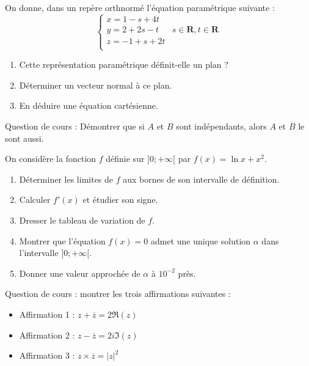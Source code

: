 \begin{question}[topic=géométrie]
On donne, dans un repère orthnormé l'équation paramétrique suivante :
\[ \left\lbrace \begin{array}{lc}
    x = 1 - s + 4t &                                 \\
    y = 2 + 2s -t  & s\in\mathbf{R}, t\in \mathbf{R} \\
    z = -1 +s + 2t &                                 \\
\end{array}\right.\]

\begin{enumerate}
  \item Cette représentation paramétrique définit-elle un plan ?
  \item Déterminer un vecteur normal à ce plan.
  \item En déduire une équation cartésienne.
\end{enumerate}
\end{question}

\begin{question}[topic=probabilités]
Question de cours : Démontrer que si $A$ et $B$ sont indépendants, alors
$A$ et $\overline{B}$ le sont aussi.
\end{question}

\begin{question}[topic=fonction]
On considère la fonction $f$ définie sur $]0;+\infty[$ par $f(x) = \ln x
+ x^2$.

\begin{enumerate}
  \item Déterminer les limites de $f$ aux bornes de son intervalle de
    définition.
  \item Calculer $f'(x)$ et étudier son signe.
  \item Dresser le tableau de variation de $f$.
  \item Montrer que l'équation $f(x) = 0$ admet une unique solution
    $\alpha$ dans l'intervalle $]0;+\infty[$.
  \item Donner une valeur approchée de $\alpha$ à $10^{-2}$ près.
\end{enumerate}
\end{question}

\begin{question}[topic=nombres_complexes]
Question de cours : montrer les trois affirmations suivantes :
\begin{itemize}
  \item Affirmation 1 : $z + \overline{z} = 2\Re(z)$
  \item Affirmation 2 : $z - \overline{z} = 2i\Im(z)$
  \item Affirmation 3 : $z \times \overline{z} = \lvert z \rvert^2$
\end{itemize}
\end{question}

